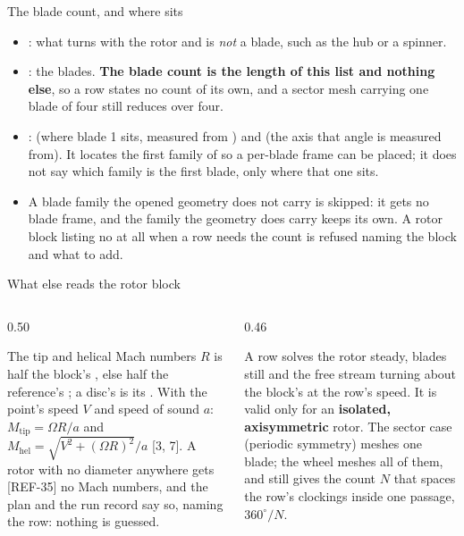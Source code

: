 \begin{frame}{The blade count, and where  sits}
\begin{itemize}\small
  \item {}: what turns with the rotor and is
        \emph{not} a blade, such as the hub or a spinner.
  \item {}: the blades. \textbf{The blade count is
        the length of this list and nothing else}, so a row states no
        count of its own, and a sector mesh carrying one blade of four
        still reduces over four.
  \item {}:  (where blade 1 sits, measured
        from ) and  (the axis that angle is measured
        from). It locates the first family of  so
        a per-blade frame can be placed; it does not say which family is
        the first blade, only where that one sits.
  \item A blade family the opened geometry does not carry is skipped: it
        gets no blade frame, and the family the geometry does carry keeps
        its own. A rotor block listing no  at all
        when a row needs the count is refused naming the block and what
        to add.
\end{itemize}
\end{frame}

\begin{frame}{What else reads the rotor block}
\begin{columns}[T]
\begin{column}{0.50\textwidth}
\begin{block}{The tip and helical Mach numbers}
\small \(R\) is half the block's , else half the
reference's ; a disc's is its
. With the point's speed \(V\) and speed of sound \(a\):
\(M_\mathrm{tip} = \Omega R / a\) and \(M_\mathrm{hel} =
\sqrt{V^2 + (\Omega R)^2}/a\) [3, 7]. A rotor with no diameter anywhere gets [REF-35]
no Mach numbers, and the plan and the run record say so, naming the row:
nothing is guessed.
\end{block}
\end{column}
\begin{column}{0.46\textwidth}
\begin{block}{A  row}
\small solves the rotor steady, blades still and the free stream turning
about the block's  at the row's speed. It is valid only for an
\textbf{isolated, axisymmetric} rotor. The sector case (periodic symmetry)
meshes one blade; the wheel meshes all of them, and
 still gives the count \(N\) that spaces the row's
 clockings inside one passage, \(360^\circ/N\).
\end{block}
\end{column}
\end{columns}
\end{frame}
